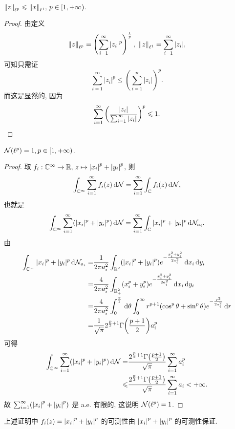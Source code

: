 \begin{lemma}
$\fs{z}_{\lp}\leq\fs{x}_{\ell^1},\,p\in[1,+\infty)$.
\end{lemma}
\begin{proof}
由定义
$$\fs{z}_{\lp}=\left(\sum_{i=1}^\infty |z_i|^p\right)^{\frac{1}{p}},\ \fs{z}_{\ell^1}=\sum_{i=1}^\infty|z_i|,$$
可知只需证
$$\sum_{i=1}^\infty|z_i|^p\leq\left(\sum_{i=1}^\infty |z_i|\right)^p.$$
而这是显然的, 因为
\begin{equation*}
\sum_{i=1}^\infty\left(\frac{|z_i|}{\sum_{i=1}^\infty|z_i|}\right)^p\leq 1.\qedhere
\end{equation*}
\end{proof}
\begin{theorem}
$\mathcal{N}(\lp)=1,p\in[1,+\infty)$.
\end{theorem}
\begin{proof}
取 $f_i:\cc^{\infty}\to\rr,\,z\mapsto \jd{x_i}^p+\jd{y_i}^p$, 则
\[\int_{\cc^{\infty}}\sum_{i=1}^{\infty}f_i\xk{z}\dd\NN=\sum_{i=1}^{\infty}\int_{\cc}f_i\xk{z}\dd\NN,\]
也就是
\[\int_{\cc^{\infty}}\sum_{i=1}^\infty (|x_i|^p+|y_i|^p)\dd\mathcal{N}=\sum_{i=1}^\infty\int_{\cc}|x_i|^p+|y_i|^p\dd\mathcal{N}_{a_i}.\]
由
\begin{align*}
\int_{\cc^\infty}|x_i|^p+|y_i|^p\dd\mathcal{N}_{a_i}
=&\frac{1}{2\pi a_i^2}\int_{\rr^2}\xk{\jd{x_i}^p+\jd{y_i}^p}e^{-\frac{x_i^2+y_i^2}{2a_i^2}}\dd x_i\dd y_i\\
=&\frac{4}{2\pi a_i^2}\int_{\rr^2_+}\xk{x_i^p+y_i^p}e^{-\frac{x_i^2+y_i^2}{2a_i^2}}\dd x_i\dd y_i\\
=&\frac{4}{2\pi a_i^2}\int_{0}^{\frac{\pi}{2}}\dd\theta\int_{0}^{\infty}r^{p+1}\xk{\cos^p\theta+\sin^p\theta}e^{-\frac{r^2}{2a_i^2}}\dd r\\
=&\frac{1}{\sqrt{\pi}}2^{\frac{p}{2}+1}\Gamma\xk{\frac{p+1}{2}}a_i^p
\end{align*}
可得
\begin{align*}
\int_{\cc^\infty}\sum_{i=1}^\infty \xk{|x_i|^p+|y_i|^p}\dd\mathcal{N}=&\frac{2^{\frac{p}{2}+1}\Gamma\xk{\frac{p+1}{2}}}{\sqrt{\pi}}\sum_{i=1}^\infty a_i^p\\
\leq&\frac{2^{\frac{p}{2}+1}\Gamma\xk{\frac{p+1}{2}}}{\sqrt{\pi}}\sum_{i=1}^\infty a_i<+\infty.
\end{align*}
故 $\sum_{i=1}^{\infty}\xk{\jd{x_i}^p+\jd{y_i}^p}$ 是 a.e. 有限的, 这说明 $\NN\xk{\lp}=1$.
\end{proof}
\begin{remark}[补充]
上述证明中 $f_i\xk{z}=\jd{x_i}^p+\jd{y_i}^p$ 的可测性由 $\jd{x_i}^p+\jd{y_i}^p$ 的可测性保证.
\end{remark}
